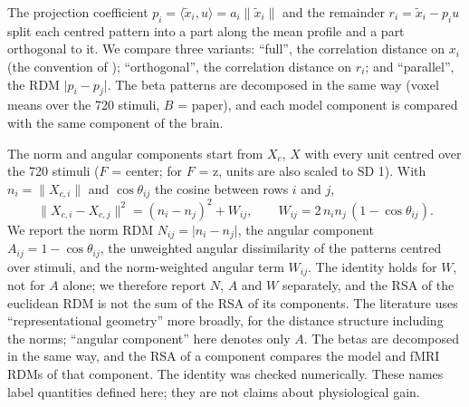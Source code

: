 The projection coefficient $p_i = \langle \tilde{x}_i, u \rangle = a_i \lVert \tilde{x}_i \rVert$
and the remainder $r_i = \tilde{x}_i - p_i u$ split each centred pattern into a part along
the mean profile and a part orthogonal to it. We compare three variants: ``full'', the
correlation distance on $x_i$ (the convention of \citet{evalres}); ``orthogonal'', the
correlation distance on $r_i$; and ``parallel'', the RDM $\lvert p_i - p_j \rvert$. The beta
patterns are decomposed in the same way (voxel means over the 720 stimuli, $B$ = paper),
and each model component is compared with the same component of the brain.

The norm and angular components start from $X_c$, $X$ with every unit centred over the
720 stimuli ($F$ = center; for $F$ = z, units are also scaled to SD 1). With
$n_i = \lVert X_{c,i} \rVert$ and $\cos\theta_{ij}$ the cosine between rows $i$ and $j$,
\begin{equation}
  \lVert X_{c,i} - X_{c,j} \rVert^2 = (n_i - n_j)^2 + W_{ij}, \qquad
  W_{ij} = 2\, n_i n_j \,(1 - \cos\theta_{ij}).
\end{equation}
We report the norm RDM $N_{ij} = \lvert n_i - n_j \rvert$, the angular component
$A_{ij} = 1 - \cos\theta_{ij}$, the unweighted angular dissimilarity of the patterns
centred over stimuli, and the norm-weighted angular term $W_{ij}$. The identity holds for
$W$, not for $A$ alone; we therefore report $N$, $A$ and $W$ separately, and the RSA of the
euclidean RDM is not the sum of the RSA of its components. The literature uses
``representational geometry'' more broadly, for the distance structure including the
norms; ``angular component'' here denotes only $A$. The betas are decomposed in the same
way, and the RSA of a component compares the model and fMRI RDMs of that component. The
identity was checked numerically. These names label quantities defined here; they are
not claims about physiological gain.
